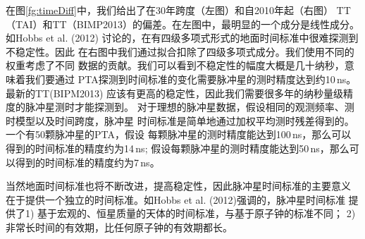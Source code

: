 在图\ref{fg:timeDiff}中，我们给出了在30年跨度（左图）和自2010年起（右图）
TT（TAI）和TT（BIMP2013）的偏差。在左图中，最明显的一个成分是线性成分。
如Hobbs et al. (2012)\supercite{hcm+12}
讨论的，在有四级多项式形式的地面时间标准中很难探测到不稳定性。因此
在右图中我们通过拟合扣除了四级多项式成分。我们使用不同的权重考虑了不同
数据的贡献。我们可以看到不稳定性的幅度大概是几十纳秒，意味着我们要通过
PTA探测到时间标准的变化需要脉冲星的测时精度达到约10\,ns。最新的TT(BIPM2013)
应该有更高的稳定性，因此我们需要很多年的纳秒量级精度的脉冲星测时才能探测到。
对于理想的脉冲星数据，假设相同的观测频率、测时模型以及时间跨度，脉冲星
时间标准是简单地通过加权平均测时残差得到的。一个有50颗脉冲星的PTA，假设
每颗脉冲星的测时精度能达到100\,ns，那么可以得到的时间标准的精度约为14\,ns;
假设每颗脉冲星的测时精度能达到50\,ns，那么可以得到的时间标准的精度约为7\,ns。

当然地面时间标准也将不断改进，提高稳定性，因此脉冲星时间标准的主要意义
在于提供一个独立的时间标准。如Hobbs et al. (2012)强调的，脉冲星时间标准
提供了1) 基于宏观的、恒星质量的天体的时间标准，与基于原子钟的标准不同；
2) 非常长时间的有效期，比任何原子钟的有效期都长。

